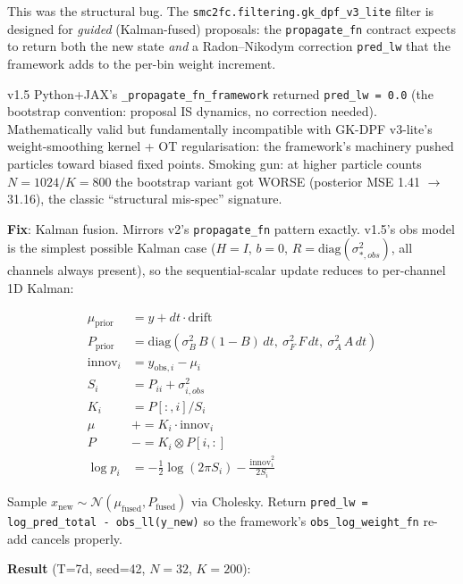 \documentclass[11pt,a4paper]{article}
\begin{document}
This was the structural bug. The \texttt{smc2fc.filtering.gk\_dpf\_v3\_lite}
filter is designed for \emph{guided} (Kalman-fused) proposals: the
\texttt{propagate\_fn} contract expects to return both the new state
\emph{and} a Radon--Nikodym correction \texttt{pred\_lw} that the
framework adds to the per-bin weight increment.

v1.5 Python+JAX's \texttt{\_propagate\_fn\_framework} returned
\texttt{pred\_lw = 0.0} (the bootstrap convention: proposal IS
dynamics, no correction needed). Mathematically valid but
fundamentally incompatible with GK-DPF v3-lite's
weight-smoothing kernel + OT regularisation: the framework's
machinery pushed particles toward biased fixed points. Smoking
gun: at higher particle counts $N=1024 / K=800$ the bootstrap
variant got WORSE (posterior MSE 1.41 $\to$ 31.16), the classic
``structural mis-spec'' signature.

\textbf{Fix}: Kalman fusion. Mirrors v2's
\texttt{propagate\_fn} pattern exactly. v1.5's obs model is the
simplest possible Kalman case ($H = I$, $b = 0$,
$R = \text{diag}(\sigma_{*,obs}^2)$, all channels always
present), so the sequential-scalar update reduces to per-channel
1D Kalman:

\begin{align*}
  \mu_{\text{prior}} &= y + dt \cdot \text{drift} \\
  P_{\text{prior}}   &= \text{diag}(\sigma_B^2 \, B(1{-}B) \, dt,\
                                       \sigma_F^2 \, F \, dt,\
                                       \sigma_A^2 \, A \, dt) \\
  \text{innov}_i     &= y_{\text{obs},i} - \mu_i \\
  S_i                &= P_{ii} + \sigma_{i,obs}^2 \\
  K_i                &= P[:, i] / S_i \\
  \mu                &\mathrel{+}= K_i \cdot \text{innov}_i \\
  P                  &\mathrel{-}= K_i \otimes P[i, :] \\
  \log p_i           &= -\tfrac12 \log(2\pi S_i) - \tfrac{\text{innov}_i^2}{2 S_i}
\end{align*}

Sample $x_{\text{new}} \sim \mathcal{N}(\mu_{\text{fused}},
P_{\text{fused}})$ via Cholesky. Return \texttt{pred\_lw =
log\_pred\_total - obs\_ll(y\_new)} so the framework's
\texttt{obs\_log\_weight\_fn} re-add cancels properly.

\textbf{Result} (T=7d, seed=42, $N=32$, $K=200$):
\end{document}
